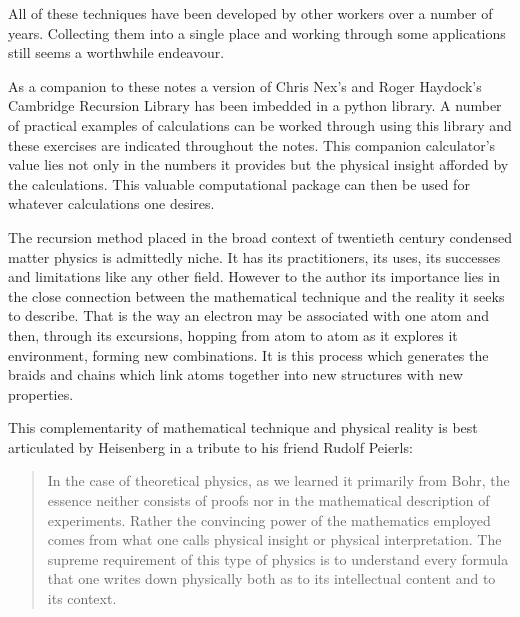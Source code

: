 All of these techniques have been developed by other workers 
over a number of years. Collecting them into a single place 
and working through some applications still seems a worthwhile 
endeavour. 

As a companion to these notes a version of Chris Nex's and 
Roger Haydock's Cambridge Recursion Library
has been imbedded in a python library. A number of practical examples 
of calculations can be worked through using this library and these 
exercises are indicated throughout the notes. 
This companion calculator's value lies not only
in the numbers it provides but the physical insight afforded by the 
calculations. This valuable computational package can then be used for 
whatever calculations one desires.

The recursion method placed in the broad context of twentieth century 
condensed matter physics is admittedly niche. It has its practitioners, 
its uses, its successes and limitations like any other field.
However to the author its importance lies in the close connection between the mathematical
technique and the reality it seeks to describe. That is the way 
an electron may be associated with 
one atom and then, through its excursions, hopping from atom to atom as it explores 
it environment, forming new combinations. It is this process which
generates the braids and chains which link atoms together into new structures 
with new properties.


%

This complementarity of mathematical technique and physical reality 
is best articulated by Heisenberg in a tribute to his friend Rudolf Peierls:
 
\begin{quote}
In the case of theoretical physics, as we learned it primarily from
Bohr, the essence neither consists of proofs
nor in the mathematical description of experiments.
Rather the convincing power of the mathematics employed comes from
what one calls physical insight or physical interpretation. The supreme
requirement of this type of physics is to understand every formula that
one writes down physically both as to its intellectual content and to its context.
\end{quote}
 
